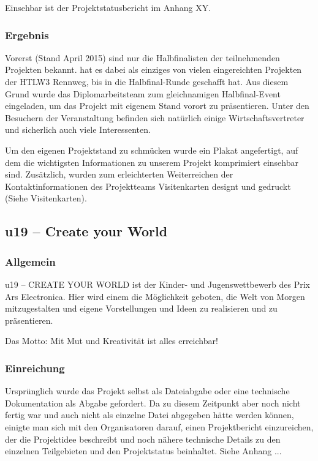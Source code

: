 Einsehbar ist der Projektstatusbericht im Anhang XY.

\subsubsection{Ergebnis}
Vorerst (Stand April 2015) sind nur die Halbfinalisten der teilnehmenden Projekten bekannt.
\sblit hat es dabei als einziges von vielen eingereichten Projekten der HTLW3 Rennweg,
bis in die Halbfinal-Runde geschafft hat. Aus diesem Grund wurde das Diplomarbeitsteam
zum gleichnamigen Halbfinal-Event eingeladen, um das Projekt mit eigenem Stand vorort zu präsentieren.
Unter den Besuchern der Veranstaltung befinden sich natürlich einige Wirtschaftsvertreter und
sicherlich auch viele Interessenten.

Um den eigenen Projektstand zu schmücken wurde ein Plakat angefertigt, auf dem die wichtigsten Informationen
zu unserem Projekt komprimiert einsehbar sind.
Zusätzlich, wurden zum erleichterten Weiterreichen der Kontaktinformationen des Projektteams Visitenkarten
designt und gedruckt (Siehe Visitenkarten).

\subsection{u19 -- Create your World}
\subsubsection{Allgemein}
u19 – CREATE YOUR WORLD ist der Kinder- und Jugenswettbewerb des \gls{Prix Ars Electronica}.
Hier wird einem die Möglichkeit geboten, die Welt von Morgen mitzugestalten und eigene Vorstellungen
und Ideen zu realisieren und zu präsentieren.


Das Motto: Mit Mut und Kreativität ist alles erreichbar!

\subsubsection{Einreichung}
Ursprünglich wurde das Projekt selbst als Dateiabgabe oder eine technische Dokumentation als Abgabe gefordert. Da \sblit zu diesem Zeitpunkt
aber noch nicht fertig war und auch nicht als einzelne Datei abgegeben hätte werden können,
einigte man sich mit den Organisatoren darauf, einen Projektbericht einzureichen, der die Projektidee
beschreibt und noch nähere technische Details zu den einzelnen Teilgebieten und den Projektstatus beinhaltet.
Siehe Anhang ...

